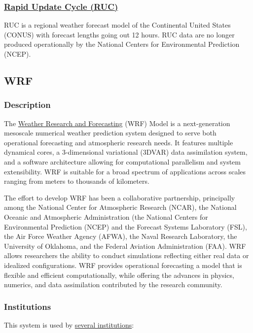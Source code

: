 \documentclass[11pt]{article}
\begin{document}
\subsubsection{\href{http://www.ncdc.noaa.gov/data-access/model-data/model-datasets/rapid-update-cycle-ruc}{Rapid Update Cycle (RUC)}}
\label{sec-2-1-6}
RUC is a regional weather forecast model of the Continental United
States (CONUS) with forecast lengths going out 12 hours. RUC data are
no longer produced operationally by the National Centers for
Environmental Prediction (NCEP).

\subsection{WRF}
\label{sec-2-2}

\subsubsection{Description}
\label{sec-2-2-1}
The \href{http://www.wrf-model.org/index.php}{Weather Research and Forecasting} (WRF) Model is a
next-generation mesoscale numerical weather prediction system
designed to serve both operational forecasting and atmospheric
research needs. It features multiple dynamical cores, a
3-dimensional variational (3DVAR) data assimilation system, and a
software architecture allowing for computational parallelism and
system extensibility. WRF is suitable for a broad spectrum of
applications across scales ranging from meters to thousands of
kilometers.

The effort to develop WRF has been a collaborative partnership,
principally among the National Center for Atmospheric Research
(NCAR), the National Oceanic and Atmospheric Administration (the
National Centers for Environmental Prediction (NCEP) and the
Forecast Systems Laboratory (FSL), the Air Force Weather Agency
(AFWA), the Naval Research Laboratory, the University of Oklahoma,
and the Federal Aviation Administration (FAA). WRF allows
researchers the ability to conduct simulations reflecting either
real data or idealized configurations. WRF provides operational
forecasting a model that is flexible and efficient
computationally, while offering the advances in physics, numerics,
and data assimilation contributed by the research community.
\subsubsection{Institutions}
\label{sec-2-2-2}
This system is used by \href{http://wrf-model.org/plots/wrfrealtime.php}{several institutions}:
\end{document}

